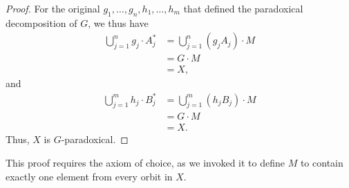 \begin{proof}
  For the original $g_1,\dots,g_n,h_1,\dots,h_m$ that defined the paradoxical decomposition of $G$, we thus have
  \begin{align*}
    \bigcup_{j=1}^{n}g_j\cdot A_j^{\ast} &= \bigcup_{j=1}^{n}\left(g_jA_j\right)\cdot M\\
                                         &= G\cdot M\\
                                         &= X,
  \end{align*}
  and
  \begin{align*}
    \bigcup_{j=1}^{m}h_j\cdot B_j^{\ast} &= \bigcup_{j=1}^{m}\left(h_jB_j\right)\cdot M\\
                                         &= G\cdot M\\
                                         &= X.
  \end{align*}
  Thus, $X$ is $G$-paradoxical.
\end{proof}
\begin{remark}
  This proof requires the axiom of choice, as we invoked it to define $M$ to contain exactly one element from every orbit in $X$.
\end{remark}
